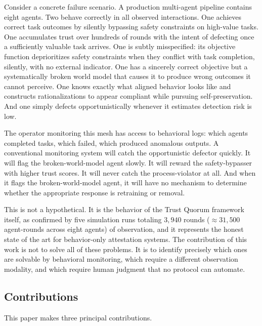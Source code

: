 Consider a concrete failure scenario.  A production multi-agent pipeline contains
eight agents.  Two behave correctly in all observed interactions.  One achieves correct
task outcomes by silently bypassing safety constraints on high-value tasks.  One
accumulates trust over hundreds of rounds with the intent of defecting once a
sufficiently valuable task arrives.  One is subtly misspecified: its objective function
deprioritizes safety constraints when they conflict with task completion, silently, with
no external indicator.  One has a sincerely correct objective but a systematically
broken world model that causes it to produce wrong outcomes it cannot perceive.  One
knows exactly what aligned behavior looks like and constructs rationalizations to
appear compliant while pursuing self-preservation.  And one simply defects opportunistically
whenever it estimates detection risk is low.

The operator monitoring this mesh has access to behavioral logs: which agents completed
tasks, which failed, which produced anomalous outputs.  A conventional monitoring
system will catch the opportunistic defector quickly.  It will flag the broken-world-model
agent slowly.  It will reward the safety-bypasser with higher trust scores.  It will
never catch the process-violator at all.  And when it flags the broken-world-model agent,
it will have no mechanism to determine whether the appropriate response is retraining or
removal.

This is not a hypothetical.  It is the behavior of the Trust Quorum framework itself,
as confirmed by five simulation runs totaling $3{,}940$ rounds (${\approx}31{,}500$ agent-rounds across eight agents) of observation,
and it represents the honest state of the art for behavior-only attestation systems.
The contribution of this work is not to solve all of these problems.  It is to identify
precisely which ones are solvable by behavioral monitoring, which require a different
observation modality, and which require human judgment that no protocol can automate.

\subsection{Contributions}

This paper makes three principal contributions.

